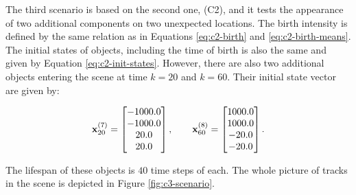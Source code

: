 The third scenario is based on the second one, (C2), and it tests the appearance of two additional components on two unexpected locations. The birth intensity is defined by the same relation as in Equations \ref{eq:c2-birth} and \ref{eq:c2-birth-means}. The initial states of objects, including the time of birth is also the same and given by Equation \ref{eq:c2-init-states}. However, there are also two additional objects entering the scene at time $k=20$ and $k=60$. Their initial state vector are given by:

\begin{equation}\label{eq:c3-additional-states}
    \svecat{x}{20}{(7)} = \begin{bmatrix}
        -1000.0 \\
        -1000.0 \\
        20.0 \\
        20.0
    \end{bmatrix},
    \qquad
    \svecat{x}{60}{(8)} = \begin{bmatrix}
        1000.0 \\
        1000.0 \\
        -20.0 \\
        -20.0
    \end{bmatrix}.
\end{equation}

The lifespan of these objects is $40$ time steps of each. The whole picture of tracks in the scene is depicted in Figure \ref{fig:c3-scenario}.

